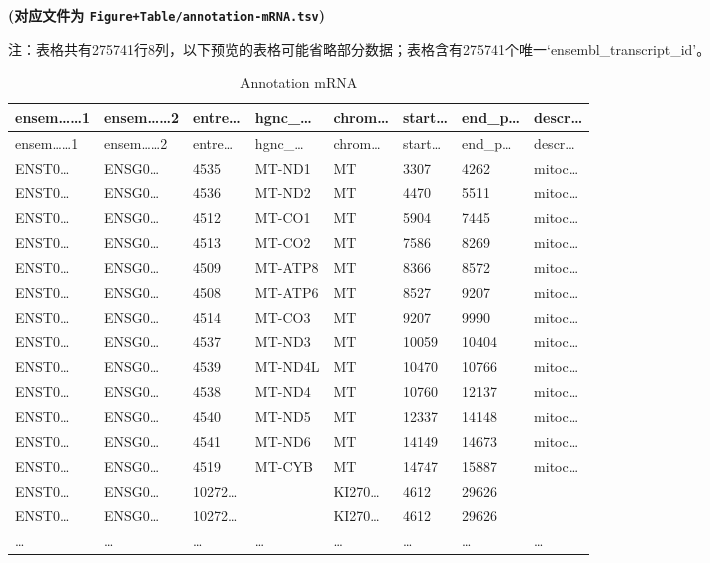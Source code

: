 \documentclass[
]{article}
\begin{document}
\textbf{(对应文件为 \texttt{Figure+Table/annotation-mRNA.tsv})}

\begin{center}\begin{tcolorbox}[colback=gray!10, colframe=gray!50, width=0.9\linewidth, arc=1mm, boxrule=0.5pt]注：表格共有275741行8列，以下预览的表格可能省略部分数据；表格含有275741个唯一`ensembl\_transcript\_id'。
\end{tcolorbox}
\end{center}

\begin{longtable}[]{@{}llllllll@{}}
\caption{\label{tab:annotation-mRNA}Annotation mRNA}\tabularnewline
\toprule
ensem\ldots\ldots1 & ensem\ldots\ldots2 & entre\ldots{} & hgnc\_\ldots{} & chrom\ldots{} & start\ldots{} & end\_p\ldots{} & descr\ldots{}\tabularnewline
\midrule
\endfirsthead
\toprule
ensem\ldots\ldots1 & ensem\ldots\ldots2 & entre\ldots{} & hgnc\_\ldots{} & chrom\ldots{} & start\ldots{} & end\_p\ldots{} & descr\ldots{}\tabularnewline
\midrule
\endhead
ENST0\ldots{} & ENSG0\ldots{} & 4535 & MT-ND1 & MT & 3307 & 4262 & mitoc\ldots{}\tabularnewline
ENST0\ldots{} & ENSG0\ldots{} & 4536 & MT-ND2 & MT & 4470 & 5511 & mitoc\ldots{}\tabularnewline
ENST0\ldots{} & ENSG0\ldots{} & 4512 & MT-CO1 & MT & 5904 & 7445 & mitoc\ldots{}\tabularnewline
ENST0\ldots{} & ENSG0\ldots{} & 4513 & MT-CO2 & MT & 7586 & 8269 & mitoc\ldots{}\tabularnewline
ENST0\ldots{} & ENSG0\ldots{} & 4509 & MT-ATP8 & MT & 8366 & 8572 & mitoc\ldots{}\tabularnewline
ENST0\ldots{} & ENSG0\ldots{} & 4508 & MT-ATP6 & MT & 8527 & 9207 & mitoc\ldots{}\tabularnewline
ENST0\ldots{} & ENSG0\ldots{} & 4514 & MT-CO3 & MT & 9207 & 9990 & mitoc\ldots{}\tabularnewline
ENST0\ldots{} & ENSG0\ldots{} & 4537 & MT-ND3 & MT & 10059 & 10404 & mitoc\ldots{}\tabularnewline
ENST0\ldots{} & ENSG0\ldots{} & 4539 & MT-ND4L & MT & 10470 & 10766 & mitoc\ldots{}\tabularnewline
ENST0\ldots{} & ENSG0\ldots{} & 4538 & MT-ND4 & MT & 10760 & 12137 & mitoc\ldots{}\tabularnewline
ENST0\ldots{} & ENSG0\ldots{} & 4540 & MT-ND5 & MT & 12337 & 14148 & mitoc\ldots{}\tabularnewline
ENST0\ldots{} & ENSG0\ldots{} & 4541 & MT-ND6 & MT & 14149 & 14673 & mitoc\ldots{}\tabularnewline
ENST0\ldots{} & ENSG0\ldots{} & 4519 & MT-CYB & MT & 14747 & 15887 & mitoc\ldots{}\tabularnewline
ENST0\ldots{} & ENSG0\ldots{} & 10272\ldots{} & & KI270\ldots{} & 4612 & 29626 &\tabularnewline
ENST0\ldots{} & ENSG0\ldots{} & 10272\ldots{} & & KI270\ldots{} & 4612 & 29626 &\tabularnewline
\ldots{} & \ldots{} & \ldots{} & \ldots{} & \ldots{} & \ldots{} & \ldots{} & \ldots{}\tabularnewline
\bottomrule
\end{longtable}
\end{document}
